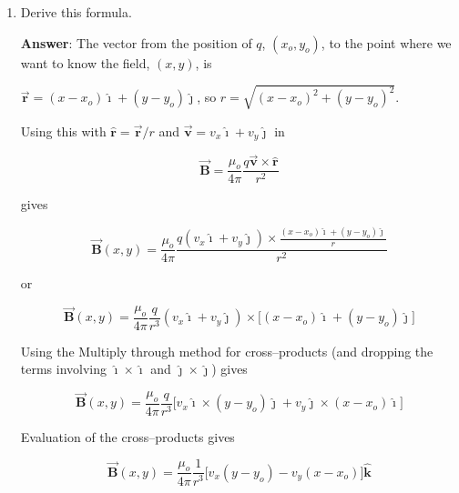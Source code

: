 \documentclass{article}
\newcommand{\ds}[0]{\displaystyle}
\newcommand{\ihat}[0]{\hat{\boldsymbol{\imath}}}
\newcommand{\jhat}[0]{\hat{\boldsymbol{\jmath}}}
\newcommand{\khat}[0]{\hat{\boldsymbol{k}}}
\newcommand{\rhat}[0]{\hat{\mathbf{r}}}
\newcommand{\bfvec}[1]{\vec{\mathbf{#1}}}
\begin{document}
\begin{enumerate}
  \item Derive this formula.

        \ifsolutions
        \textbf{Answer}: 
        The vector from the position of $q$, $(x_o,y_o)$, to the point where we want to know the field, $(x,y)$, is

        $\bfvec{r} = (x-x_o)\ihat + (y-y_o)\jhat$, so $r=\sqrt{(x-x_o)^2+(y-y_o)^2}$.

        Using this with $\rhat=\bfvec{r}/r$ and $\bfvec{v}=v_x\ihat+v_y\jhat$ in

        \vskip 12pt

        $$
        \bfvec{B} = \frac{\mu_o}{4\pi}\frac{q\bfvec{v}\times\hat{\mathbf{r}}}{r^2}
        $$

        gives

        $$
        \bfvec{B}(x,y) = \frac{\mu_o}{4\pi}\frac{q (v_x\ihat+v_y\jhat)\times\ds\frac{(x-x_o)\ihat + (y-y_o)\jhat}{r}}{r^2}
        $$

        or

        $$
        \bfvec{B}(x,y) = \frac{\mu_o}{4\pi}\frac{q}{r^3}(v_x\ihat+v_y\jhat)\times \big[(x-x_o)\ihat + (y-y_o)\jhat\big]
        $$

        Using the Multiply through method for cross--products (and dropping the terms involving $\ihat\times\ihat$ and $\jhat\times\jhat$) gives

        $$
        \bfvec{B}(x,y) = \frac{\mu_o}{4\pi}\frac{q}{r^3}\big[v_x\ihat\times (y-y_o)\jhat + v_y\jhat\times (x-x_o)\ihat\big]
        $$

        Evaluation of the cross--products gives

        $$
        \bfvec{B}(x,y)= \frac{\mu_o}{4\pi} \frac{1}{r^3} \big[v_x(y-y_o) - v_y(x-x_o)\big]\khat
        $$
        \else

        \fi

\end{enumerate}
\end{document}

